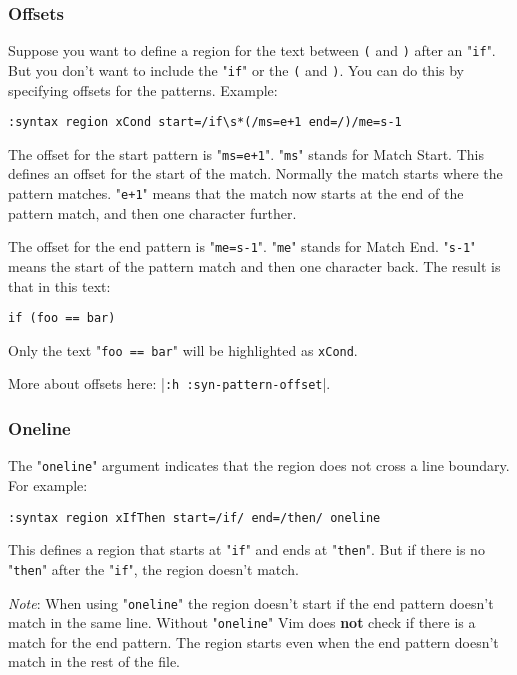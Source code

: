 \subsubsection{Offsets}
Suppose you want to define a region for the text between \texttt{(} and \texttt{)} after an "\texttt{if}".
But you don't want to include the "\texttt{if}" or the \texttt{(} and \texttt{)}.
You can do this by specifying offsets for the patterns.
Example:

\begin{Verbatim}[samepage=true]
 :syntax region xCond start=/if\s*(/ms=e+1 end=/)/me=s-1
\end{Verbatim}

The offset for the start pattern is "\texttt{ms=e+1}".
"\texttt{ms}" stands for Match Start.
This defines an offset for the start of the match.
Normally the match starts where the pattern matches.
"\texttt{e+1}" means that the match now starts at the end of the pattern match, and then one character further.

The offset for the end pattern is "\texttt{me=s-1}".
"\texttt{me}" stands for Match End.
"\texttt{s-1}" means the start of the pattern match and then one character back.
The result is that in this text:

\begin{Verbatim}[samepage=true]
    if (foo == bar) 
\end{Verbatim}

Only the text "\texttt{foo == bar}" will be highlighted as \texttt{xCond}.

More about offsets here: |\texttt{:h :syn-pattern-offset}|.
\subsubsection{Oneline}
The "\texttt{oneline}" argument indicates that the region does not cross a line boundary.
For example:

\begin{Verbatim}[samepage=true]
 :syntax region xIfThen start=/if/ end=/then/ oneline
\end{Verbatim}

This defines a region that starts at "\texttt{if}" and ends at "\texttt{then}".
But if there is no "\texttt{then}" after the "\texttt{if}", the region doesn't match.

\emph{Note}: When using "\texttt{oneline}" the region doesn't start if the end pattern doesn't match in the same line.
Without "\texttt{oneline}" Vim does \textbf{not} check if there is a match for the end pattern.
The region starts even when the end pattern doesn't match in the rest of the file.

